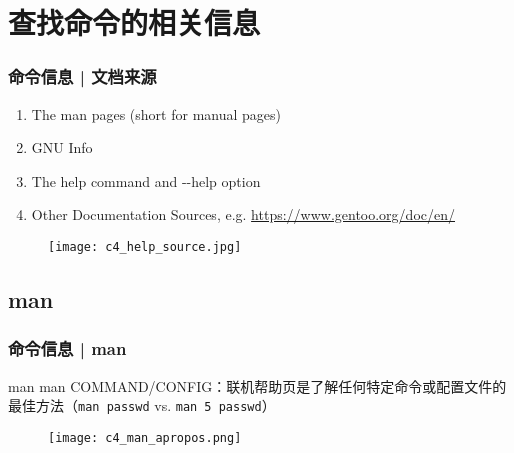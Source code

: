 \section{查找命令的相关信息}
\begin{frame}
  \frametitle{命令信息 | 文档来源}
  \begin{enumerate}
    \item The man pages (short for manual pages)
    \item GNU Info
    \item The help command and -\!-help option
    \item Other Documentation Sources, e.g. \href{https://www.gentoo.org/doc/en/}{https://www.gentoo.org/doc/en/}
  \end{enumerate}
  \begin{figure}
    \centering
    \texttt{[image: c4\_help\_source.jpg]}
  \end{figure}
\end{frame}

\subsection{man}
\begin{frame}[fragile]
  \frametitle{命令信息 | man}
  \begin{block}{man}
    \alert{man COMMAND/CONFIG}：联机帮助页是了解任何特定命令或配置文件的最佳方法（\verb|man passwd| vs. \verb|man 5 passwd|）
  \end{block}
  \begin{figure}
    \centering
    \texttt{[image: c4\_man\_apropos.png]}
  \end{figure}
\end{frame}

